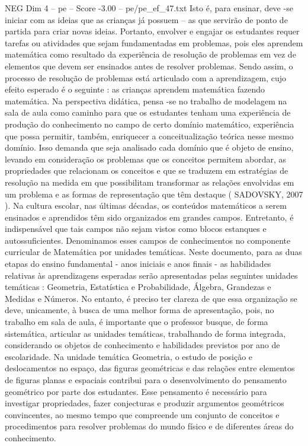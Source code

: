 \begin{textsample}{NEG Dim 4 – pe – Score -3.00 – pe/pe\_ef\_47.txt}
Isto é, para ensinar, deve -se iniciar com as ideias que as crianças já possuem – as que servirão de ponto de partida para criar novas ideias.
Portanto, envolver e engajar os estudantes requer tarefas ou atividades que sejam fundamentadas em problemas, pois eles aprendem matemática como resultado da experiência de resolução de problemas em vez de elementos que devem ser ensinados antes de resolver problemas.
Sendo assim, o processo de resolução de problemas está articulado com a aprendizagem, cujo efeito esperado é o seguinte : as crianças aprendem matemática fazendo matemática.
Na perspectiva didática, pensa -se no trabalho de modelagem na sala de aula como caminho para que os estudantes tenham uma experiência de produção do conhecimento no campo de certo domínio matemático, experiência que possa permitir, também, enriquecer a conceitualização teórica nesse mesmo domínio.
Isso demanda que seja analisado cada domínio que é objeto de ensino, levando em consideração os problemas que os conceitos permitem abordar, as propriedades que relacionam os conceitos e que se traduzem em estratégias de resolução na medida em que possibilitam transformar as relações envolvidas em um problema e as formas de representação que têm destaque ( SADOVSKY, 2007 ).
Na cultura escolar, nas últimas décadas, os conteúdos matemáticos a serem ensinados e aprendidos têm sido organizados em grandes campos.
Entretanto, é indispensável que tais campos não sejam vistos como blocos estanques e autossuficientes.
Denominamos esses campos de conhecimentos no componente curricular de Matemática por unidades temáticas.
Neste documento, para as duas etapas do ensino fundamental - anos iniciais e anos finais - as habilidades relativas às aprendizagens esperadas serão apresentadas pelas seguintes unidades temáticas : Geometria, Estatística e Probabilidade, Álgebra, Grandezas e Medidas e Números.
No entanto, é preciso ter clareza de que essa organização se deve, unicamente, à busca de uma melhor forma de apresentação, pois, no trabalho em sala de aula, é importante que o professor busque, de forma sistemática, articular as unidades temáticas, trabalhando de forma integrada, considerando os objetos de conhecimento e habilidades previstos por ano de escolaridade.
Na unidade temática Geometria, o estudo de posição e deslocamentos no espaço, das figuras geométricas e das relações entre elementos de figuras planas e espaciais contribui para o desenvolvimento do pensamento geométrico por parte dos estudantes.
Esse pensamento é necessário para investigar propriedades, fazer conjecturas e produzir argumentos geométricos convincentes, ao mesmo tempo que compreende um conjunto de conceitos e procedimentos para resolver problemas do mundo físico e de diferentes áreas do conhecimento.

\end{textsample}
